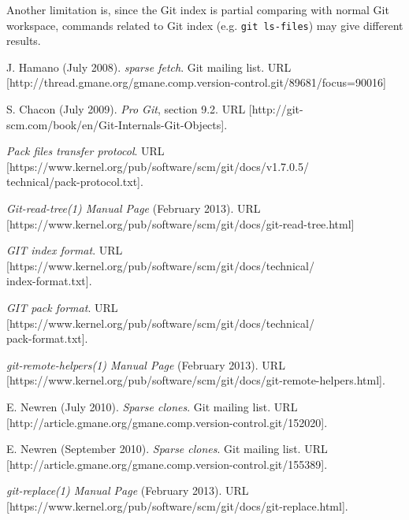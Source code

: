 \documentclass[preprint]{sigplanconf}
\begin{document}
Another limitation is, since the Git index is partial comparing with normal Git
workspace, commands related to Git index (e.g. \verb|git ls-files|) may give
different results.

\begin{thebibliography}{10}
    \softraggedright

     J. Hamano (July 2008).
    \newblock \emph{sparse fetch}.
    \newblock Git mailing list.
    \newblock URL
    [http://thread.gmane.org/gmane.comp.version-control.git/89681/focus=90016]

     S. Chacon (July 2009).
    \newblock\emph{Pro Git}, section 9.2.
    \newblock URL
    [http://git-scm.com/book/en/Git-Internals-Git-Objects].

     \emph{Pack files transfer protocol}.
    \newblock URL
    [https://www.kernel.org/pub/software/scm/git/docs/v1.7.0.5/\\
      technical/pack-protocol.txt].

     \emph{Git-read-tree(1) Manual Page} (February 2013).
    \newblock URL
    [https://www.kernel.org/pub/software/scm/git/docs/git-read-tree.html]

     \emph{GIT index format}.
    \newblock URL
    [https://www.kernel.org/pub/software/scm/git/docs/technical/\\
    index-format.txt].

     \emph{GIT pack format}.
    \newblock URL
    [https://www.kernel.org/pub/software/scm/git/docs/technical/\\
    pack-format.txt].

     \emph{git-remote-helpers(1) Manual Page}
        (February 2013).
    \newblock URL
    [https://www.kernel.org/pub/software/scm/git/docs/git-remote-helpers.html].

    E. Newren (July 2010).
    \newblock \emph{Sparse clones}.
    \newblock Git mailing list.
    \newblock URL
    [http://article.gmane.org/gmane.comp.version-control.git/152020].

    E. Newren (September 2010).
    \newblock \emph{Sparse clones}.
    \newblock Git mailing list.
    \newblock URL
    [http://article.gmane.org/gmane.comp.version-control.git/155389].

     \emph{git-replace(1) Manual Page} (February 2013).
    \newblock URL
    [https://www.kernel.org/pub/software/scm/git/docs/git-replace.html].


\end{thebibliography}
\end{document}
